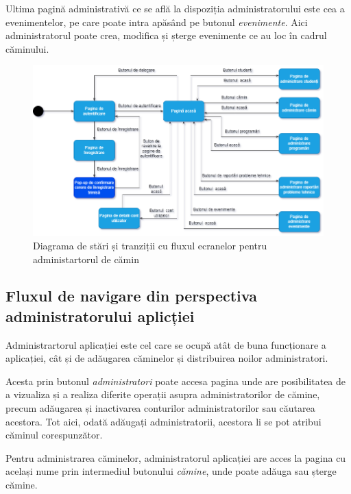 \documentclass[12pt,a4paper]{report}
\theoremstyle{definition}
\theoremstyle{remark}
\begin{document}
\par Ultima pagină administrativă ce se află la dispoziția administratorului este cea a evenimentelor, pe care poate intra apăsând pe butonul \textit{evenimente}. Aici administratorul poate crea, modifica și șterge evenimente ce au loc în cadrul căminului.

\begin{figure}[H]
    \centering
    \includegraphics[width=0.75\linewidth]{resurse/diagrame/diagrama_de_navigare.2drawio.png}
    \caption{Diagrama de stări și tranziții cu fluxul ecranelor pentru administartorul de cămin}
\end{figure}

\subsection{Fluxul de navigare din perspectiva administratorului aplicției}
\par Administrartorul aplicației este cel care se ocupă atât de buna funcționare a \textnormal{ap\-li\-ca\-ți\-ei}, cât și de adăugarea căminelor și distribuirea noilor administratori.

\par Acesta prin butonul \textit{administratori} poate accesa pagina unde are posibilitatea de a vizualiza și  a realiza diferite operații asupra administratorilor de cămine, precum adăugarea și inactivarea conturilor administratorilor sau căutarea acestora. Tot aici, odată adăugați administratorii, acestora li se pot atribui căminul corespunzător.

\par Pentru administrarea căminelor, administratorul aplicației are acces la pagina cu același nume prin intermediul butonului \textit{cămine}, unde poate adăuga sau șterge cămine.
\end{document}
